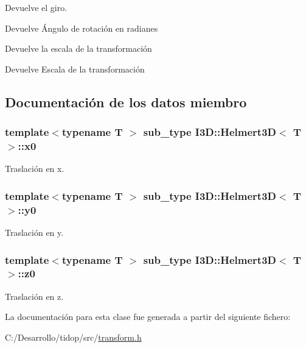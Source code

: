 Devuelve el giro. 

\begin{DoxyReturn}{Devuelve}
Ángulo de rotación en radianes
\end{DoxyReturn}
Devuelve la escala de la transformación \begin{DoxyReturn}{Devuelve}
Escala de la transformación 
\end{DoxyReturn}


\subsection{Documentación de los datos miembro}
\subsubsection[{\texorpdfstring{x0}{x0}}]{\setlength{\rightskip}{0pt plus 5cm}template$<$typename T $>$ {\bf sub\+\_\+type} {\bf I3\+D\+::\+Helmert3D}$<$ T $>$\+::x0}\hypertarget{class_i3_d_1_1_helmert3_d_a57421e1c701909b5a319dfeaba50fe20}{}\label{class_i3_d_1_1_helmert3_d_a57421e1c701909b5a319dfeaba50fe20}


Traslación en x. 

\subsubsection[{\texorpdfstring{y0}{y0}}]{\setlength{\rightskip}{0pt plus 5cm}template$<$typename T $>$ {\bf sub\+\_\+type} {\bf I3\+D\+::\+Helmert3D}$<$ T $>$\+::y0}\hypertarget{class_i3_d_1_1_helmert3_d_a8367d52bdb3d60a015e9c30ce7ccacde}{}\label{class_i3_d_1_1_helmert3_d_a8367d52bdb3d60a015e9c30ce7ccacde}


Traslación en y. 

\subsubsection[{\texorpdfstring{z0}{z0}}]{\setlength{\rightskip}{0pt plus 5cm}template$<$typename T $>$ {\bf sub\+\_\+type} {\bf I3\+D\+::\+Helmert3D}$<$ T $>$\+::z0}\hypertarget{class_i3_d_1_1_helmert3_d_aaa4da06457bac6b987d41a93b9d29d1e}{}\label{class_i3_d_1_1_helmert3_d_aaa4da06457bac6b987d41a93b9d29d1e}


Traslación en z. 



La documentación para esta clase fue generada a partir del siguiente fichero\+:\begin{DoxyCompactItemize}
\item 
C\+:/\+Desarrollo/tidop/src/\hyperlink{transform_8h}{transform.\+h}\end{DoxyCompactItemize}
